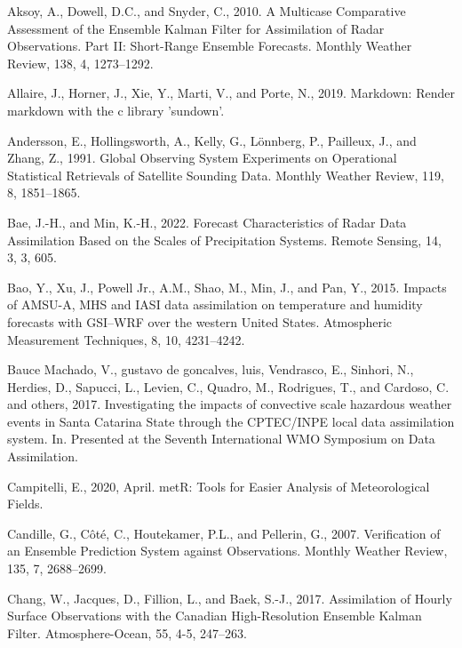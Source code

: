 \documentclass[12pt,twoside]{reedthesis}
\begin{document}
\setlength{\parindent}{-0.20in}

\hypertarget{refs}{}
\leavevmode\hypertarget{ref-aksoy2010}{}%
Aksoy, A., Dowell, D.C., and Snyder, C., 2010. A Multicase Comparative Assessment of the Ensemble Kalman Filter for Assimilation of Radar Observations. Part II: Short-Range Ensemble Forecasts. Monthly Weather Review, 138, 4, 1273--1292.

\leavevmode\hypertarget{ref-allaire2019}{}%
Allaire, J., Horner, J., Xie, Y., Marti, V., and Porte, N., 2019. Markdown: Render markdown with the c library 'sundown'.

\leavevmode\hypertarget{ref-andersson1991}{}%
Andersson, E., Hollingsworth, A., Kelly, G., Lönnberg, P., Pailleux, J., and Zhang, Z., 1991. Global Observing System Experiments on Operational Statistical Retrievals of Satellite Sounding Data. Monthly Weather Review, 119, 8, 1851--1865.

\leavevmode\hypertarget{ref-bae2022}{}%
Bae, J.-H., and Min, K.-H., 2022. Forecast Characteristics of Radar Data Assimilation Based on the Scales of Precipitation Systems. Remote Sensing, 14, 3, 3, 605.

\leavevmode\hypertarget{ref-bao2015}{}%
Bao, Y., Xu, J., Powell Jr., A.M., Shao, M., Min, J., and Pan, Y., 2015. Impacts of AMSU-A, MHS and IASI data assimilation on temperature and humidity forecasts with GSI--WRF over the western United States. Atmospheric Measurement Techniques, 8, 10, 4231--4242.

\leavevmode\hypertarget{ref-baucemachado2017}{}%
Bauce Machado, V., gustavo de goncalves, luis, Vendrasco, E., Sinhori, N., Herdies, D., Sapucci, L., Levien, C., Quadro, M., Rodrigues, T., and Cardoso, C. and others, 2017. Investigating the impacts of convective scale hazardous weather events in Santa Catarina State through the CPTEC/INPE local data assimilation system. In. Presented at the Seventh International WMO Symposium on Data Assimilation.

\leavevmode\hypertarget{ref-campitelli2020}{}%
Campitelli, E., 2020, April. metR: Tools for Easier Analysis of Meteorological Fields.

\leavevmode\hypertarget{ref-candille2007}{}%
Candille, G., Côté, C., Houtekamer, P.L., and Pellerin, G., 2007. Verification of an Ensemble Prediction System against Observations. Monthly Weather Review, 135, 7, 2688--2699.

\leavevmode\hypertarget{ref-chang2017}{}%
Chang, W., Jacques, D., Fillion, L., and Baek, S.-J., 2017. Assimilation of Hourly Surface Observations with the Canadian High-Resolution Ensemble Kalman Filter. Atmosphere-Ocean, 55, 4-5, 247--263.
\end{document}
